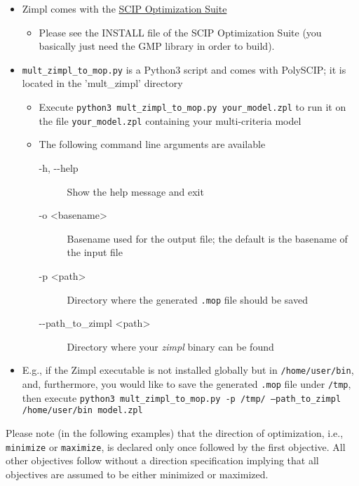 \documentclass[11pt,listof=totoc]{scrartcl}
\theoremstyle{definition}
\begin{document}
\begin{itemize}
\item Zimpl comes with the \href{http://scipopt.org/#scipoptsuite}{SCIP Optimization Suite}
\begin{itemize}
\item Please see the INSTALL file of the SCIP Optimization Suite (you
  basically just need the GMP library in order to build).
\end{itemize}
\item \texttt{mult\_zimpl\_to\_mop.py} is a Python3 script and comes with PolySCIP; it is located in the 'mult\_zimpl' directory
\begin{itemize}
\item Execute \texttt{python3 mult\_zimpl\_to\_mop.py your\_model.zpl} to run it on the file \texttt{your\_model.zpl} containing your multi-criteria model
\item The following command line arguments are available
\begin{description}
\item[-h, -{}-help] Show the help message and exit
\item[-o <basename>] Basename used for the output file; the
  default is the basename of the input file
\item[-p <path>] Directory where the generated \texttt{.mop} file should be saved
\item[-{}-path\_to\_zimpl <path>] Directory where your \emph{zimpl} binary can be found
\end{description}
\end{itemize}
\item[] E.g., if the Zimpl executable is not installed globally but in
  \texttt{/home/user/bin}, and, furthermore, you would like to save
  the generated \texttt{.mop} file under \texttt{/tmp}, then execute
  \texttt{python3 mult\_zimpl\_to\_mop.py -p /tmp/ --path\_to\_zimpl
    /home/user/bin model.zpl}
\end{itemize}

Please note (in the following examples) that the direction of optimization,
i.e., \texttt{minimize} or \texttt{maximize}, is declared only once
followed by the first objective. All other objectives follow without a
direction specification implying that all objectives are assumed to be
either minimized or maximized.
\end{document}
